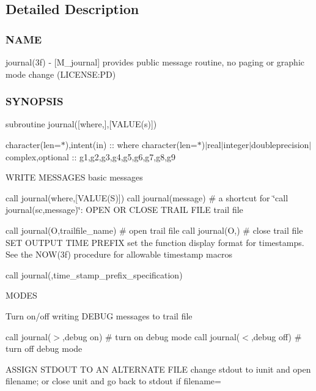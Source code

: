 \subsection{Detailed Description}
\subsubsection*{N\+A\+ME}

journal(3f) -\/ \mbox{[}M\+\_\+journal\mbox{]} provides public message routine, no paging or graphic mode change (L\+I\+C\+E\+N\+SE\+:PD) \subsubsection*{S\+Y\+N\+O\+P\+S\+IS}

subroutine journal(\mbox{[}where,\mbox{]},\mbox{[}\+V\+A\+L\+U\+E(s)\mbox{]})

character(len=$\ast$),intent(in) \+:\+: where character(len=$\ast$)$\vert$real$\vert$integer$\vert$doubleprecision$\vert$complex,optional \+:\+: g1,g2,g3,g4,g5,g6,g7,g8,g9

W\+R\+I\+TE M\+E\+S\+S\+A\+G\+ES basic messages

call journal(where,\mbox{[}\+V\+A\+L\+U\+E(\+S)\mbox{]}) call journal(message) \# a shortcut for \char`\"{}call journal(\textquotesingle{}sc\textquotesingle{},message)\char`\"{}\+: O\+P\+EN OR C\+L\+O\+SE T\+R\+A\+IL F\+I\+LE trail file

call journal(\textquotesingle{}O\textquotesingle{},trailfile\+\_\+name) \# open trail file call journal(\textquotesingle{}O\textquotesingle{},\textquotesingle{}\textquotesingle{}) \# close trail file S\+ET O\+U\+T\+P\+UT T\+I\+ME P\+R\+E\+F\+IX set the function display format for timestamps. See the N\+O\+W(3f) procedure for allowable timestamp macros

call journal(\textquotesingle{}\textquotesingle{},time\+\_\+stamp\+\_\+prefix\+\_\+specification)

M\+O\+D\+ES

Turn on/off writing D\+E\+B\+UG messages to trail file

call journal(\textquotesingle{}$>$\textquotesingle{},\textquotesingle{}debug on\textquotesingle{}) \# turn on debug mode call journal(\textquotesingle{}$<$\textquotesingle{},\textquotesingle{}debug off\textquotesingle{}) \# turn off debug mode

A\+S\+S\+I\+GN S\+T\+D\+O\+UT TO AN A\+L\+T\+E\+R\+N\+A\+TE F\+I\+LE change stdout to iunit and open filename; or close unit and go back to stdout if filename=\textquotesingle{}\textquotesingle{}

